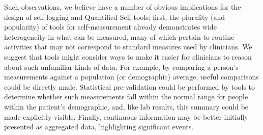 \documentclass{sigchi}
\begin{document}
Such observations, we believe have a number of obvious implications for the design of self-logging and Quantified Self tools; first, the plurality (and popularity) of tools for self-measurement already demonstrates wide heterogeneity in what can be measured, many of which pertain to routine activities that may not correspond to standard measures used by clinicians. We suggest that tools might consider ways to make it easier for clinicians to reason about such unfamiliar kinds of data.  For example, by comparing a person's measurements against a population (or demographic) average, useful comparisons could be directly made.  Statistical pre-validation could be performed by tools to determine whether such measurements fall within the normal range for people within the patient's demographic, and, like lab results, this summary could be made explicitly visible. Finally, continuous information may be better initially presented as aggregated data, highlighting significant events. 

\end{document}
